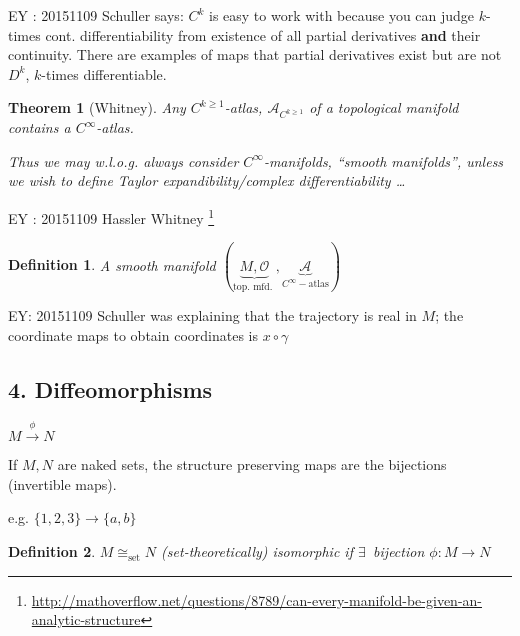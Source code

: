 \documentclass[10pt, twoside]{amsart}
\newtheorem{theorem}{Theorem}
\newtheorem{definition}{Definition}
\begin{document}
\begin{multicols*}{2}
EY : 20151109 Schuller says: $C^k$ is easy to work with because you can judge $k$-times cont. differentiability from existence of all partial derivatives \textbf{and} their continuity.  There are examples of maps that partial derivatives exist but are not $D^k$, $k$-times differentiable.  

\begin{theorem}[Whitney]
  Any $C^{k\geq 1}$-atlas, $\mathcal{A}_{C^{k\geq 1}}$ of a topological manifold \emph{contains} a $C^{\infty}$-atlas.  

Thus we may w.l.o.g. always consider $C^{\infty}$-manifolds, ``smooth manifolds'', unless we wish to define Taylor expandibility/complex differentiability \dots
\end{theorem}

EY : 20151109 Hassler Whitney \footnote{\url{http://mathoverflow.net/questions/8789/can-every-manifold-be-given-an-analytic-structure}}

\begin{definition}
  A smooth manifold $(\underbrace{ M,\mathcal{O} }_{\text{top. mfd. } }, \underbrace{ \mathcal{A}}_{C^{\infty}-\text{atlas}} )$ 
\end{definition}

EY: 20151109 Schuller was explaining that the trajectory is real in $M$; the coordinate maps to obtain coordinates is $x\circ \gamma$

\subsection{4. Diffeomorphisms}

$M \xrightarrow{ \phi } N$

If $M,N$ are naked sets, the structure preserving maps are the bijections (invertible maps).  

e.g. $\lbrace 1,2,3 \rbrace \to \lbrace a,b \rbrace$

\begin{definition}
  $M \cong_{\text{set}} N$ (set-theoretically) isomorphic if $\exists \, $ bijection $\phi : M \to N$
\end{definition}


\end{multicols*}
\end{document}
